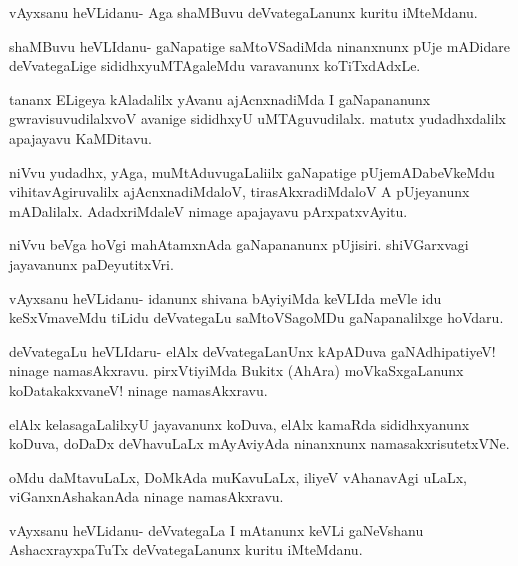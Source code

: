 \documentclass{article}
\begin{document}
\begin{mng}%
vAyxsanu heVLidanu- Aga shaMBuvu deVvategaLanunx kuritu iMteMdanu.
\end{mng}

\begin{mng}%
shaMBuvu heVLIdanu- gaNapatige saMtoVSadiMda ninanxnunx pUje mADidare deVvategaLige sididhxyuMTAgaleMdu varavanunx koTiTxdAdxLe.
\end{mng}

\begin{mng}%
tananx ELigeya kAladalilx yAvanu ajAcnxnadiMda I gaNapananunx gwravisuvudilalxvoV avanige sididhxyU uMTAguvudilalx. matutx yudadhxdalilx apajayavu KaMDitavu. 
\end{mng}

\begin{mng}%
niVvu yudadhx, yAga, muMtAduvugaLaliilx gaNapatige pUjemADabeVkeMdu vihitavAgiruvalilx ajAcnxnadiMdaloV, tirasAkxradiMdaloV A pUjeyanunx mADalilalx. AdadxriMdaleV nimage apajayavu pArxpatxvAyitu.
\end{mng}

\begin{mng}%
niVvu beVga hoVgi mahAtamxnAda gaNapananunx pUjisiri. shiVGarxvagi jayavanunx paDeyutitxVri.
\end{mng}

\begin{mng}%
vAyxsanu heVLidanu- idanunx shivana bAyiyiMda keVLIda meVle idu keSxVmaveMdu tiLidu deVvategaLu saMtoVSagoMDu gaNapanalilxge hoVdaru.
\end{mng}

\begin{mng}%
deVvategaLu heVLIdaru- elAlx deVvategaLanUnx kApADuva gaNAdhipatiyeV! ninage namasAkxravu. pirxVtiyiMda Bukitx (AhAra) moVkaSxgaLanunx koDatakakxvaneV! ninage namasAkxravu.
\end{mng}

\begin{mng}%
elAlx kelasagaLalilxyU jayavanunx koDuva, elAlx kamaRda sididhxyanunx koDuva, doDaDx deVhavuLaLx mAyAviyAda ninanxnunx namasakxrisutetxVNe.
\end{mng}

\begin{mng}%
oMdu daMtavuLaLx, DoMkAda muKavuLaLx, iliyeV vAhanavAgi uLaLx, viGanxnAshakanAda ninage namasAkxravu.
\end{mng}

\begin{mng}%
vAyxsanu heVLidanu- deVvategaLa I mAtanunx keVLi gaNeVshanu AshacxrayxpaTuTx deVvategaLanunx kuritu iMteMdanu.
\end{mng}
\end{document}
